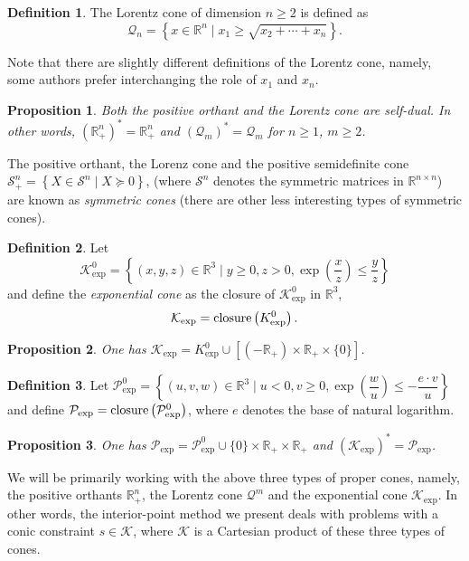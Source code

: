\documentclass[10pt]{article}
\theoremstyle{definition}
\newtheorem{defin}{Definition}
\theoremstyle{plain}
\newtheorem{prop}{Proposition}
\begin{document}
\begin{defin}
	The \textnormal{Lorentz cone} of dimension $n\geq 2$ is defined as
	\[\mathcal{Q}_n = \left\{ x \in \mathbb{R}^n \mid x_1 \geq \sqrt{x_2+\cdots+x_n} \right\}. \]
\end{defin}
Note that there are slightly different definitions of the Lorentz cone, namely, some authors prefer interchanging the role of $x_1$ and $x_n$. \\
\begin{prop}
	Both the positive orthant and the Lorentz cone are self-dual. In other words, $(\mathbb{R}_+^n)^* = \mathbb{R}_+^n$ and $(\mathcal{Q}_m)^* = \mathcal{Q}_m$ for $n\geq 1$, $m\geq 2$.
\end{prop}
The positive orthant, the Lorenz cone and the positive semidefinite cone $\mathcal{S}^n_+ = \left\{ X \in \mathcal{S}^{n} \mid X\succeq 0 \right\}$, (where $\mathcal{S}^n$ denotes the symmetric matrices in $\mathbb{R}^{n\times n}$) are known as \textit{symmetric cones} (there are other less interesting types of symmetric cones).
\begin{defin}
	Let 
	\[\mathcal{K}^0_{\exp} = \left\{(x, y, z) \in \mathbb{R}^3 \mid y \geq 0, z > 0, \exp\left(\dfrac{x}{z}\right) \leq \dfrac{y}{z}\right\}\] 
	and define the \textit{exponential cone} as the closure of $\mathcal{K}^0_{\exp}$ in $\mathbb{R}^3$, 
	\[\mathcal{K}_{\exp} = \textnormal{closure}\left(K^0_{\exp}\right).\]
\end{defin}
\begin{prop}\label{K_exp=K0_exp_union_something}
	One has $\mathcal{K}_{\exp} = K^0_{\exp} \cup \left[\left(-\mathbb{R}_+\right) \times \mathbb{R}_+ \times \{0\} \right]$.
\end{prop}

\begin{defin}
	Let $\mathcal{P}^0_{\exp} = \left\{(u,v,w) \in \mathbb{R}^3 \mid u<0, v \geq 0, \exp\left(\dfrac{w}{u}\right)\leq -\dfrac{e\cdot v}{u} \right\}$
	and define $\mathcal{P}_{\exp} = \textnormal{closure} \left(\mathcal{P}^0_{\exp}\right)$,
	where $e$ denotes the base of natural logarithm. 
\end{defin}
\begin{prop}
	One has $\mathcal{P}_{\exp} = \mathcal{P}^0_{\exp} \cup \{0\} \times \mathbb{R}_+ \times \mathbb{R}_+$ and $ (\mathcal{K}_{\exp})^* = \mathcal{P}_{\exp}$.
\end{prop}

We will be primarily working with the above three types of proper cones, namely, the positive orthants $\mathbb{R}_+^{n}$, the Lorentz cone $\mathcal{Q}^m$ and the exponential cone $\mathcal{K}_{\exp}$. In other words, the interior-point method we present deals with problems with a conic constraint $s \in \mathcal{K}$, where $\mathcal{K}$ is a Cartesian product of these three types of cones.\\
\end{document}
